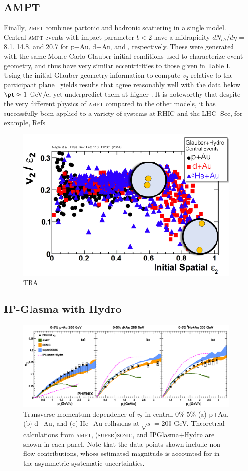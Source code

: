 \subsection{AMPT}
Finally, \textsc{ampt} combines partonic and hadronic scattering in a single model. Central \textsc{ampt} events with impact parameter $b<2$ have a midrapidity $dN_{ch}/d\eta$ = 8.1, 14.8, and 20.7 for p+Au, d+Au, and \hau, respectively. These were generated with the same Monte Carlo Glauber initial conditions used to characterize event geometry, and thus have very similar eccentricities to those given in Table I. Using the initial Glauber geometry information to compute $v_2$ relative to the participant plane~\cite{Koop:2015wea} yields results that agree reasonably well with the data below $\pt \approx 1$ GeV/c, yet underpredict them at higher \pt. It is noteworthy that despite the very different physics of \textsc{ampt} compared to the other models, it has successfully been applied to a variety of systems at RHIC and the LHC. See, for example, Refs.~\cite{Adare:2015cpn,Koop:2015wea,Ma:2016fve,ma_long-range_2014,ma_long-range_2014}

\begin{figure}
\begin{center}
\includegraphics[width=0.6\linewidth]{figs/v2_e2_ampt.png}
\caption{TBA}
\end{center}
\end{figure}
\subsection{IP-Glasma with Hydro}
\begin{figure}
\begin{center}
\includegraphics[width=0.9\linewidth]{figs/indepth_theory_comparison.png}
\caption{Transverse momentum dependence of $v_2$ in central 0\%-5\% (a) p+Au, (b) d+Au, and (c) He+Au collisions at $\sqrt{s}$ = 200 GeV. Theoretical calculations from \textsc{ampt}, \textsc{(super)sonic}, and IPGlasma+Hydro are shown in each panel. Note that the data points shown include non-flow contributions, whose estimated magnitude is accounted for in the asymmetric systematic uncertainties.}
\end{center}
\end{figure}
